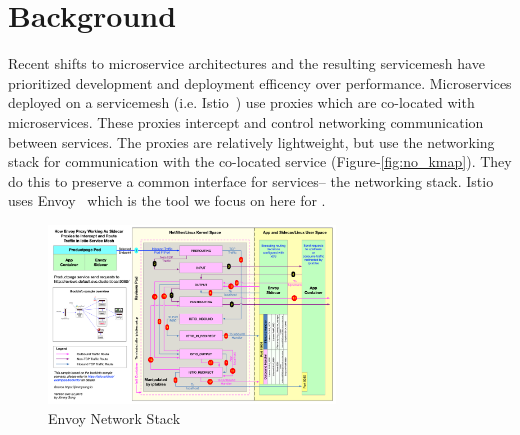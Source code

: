 \section{Background}
\label{sec:background}
Recent shifts to microservice architectures and the resulting servicemesh have prioritized development and deployment efficency over performance.
Microservices deployed on a servicemesh (i.e. Istio~\cite{istio}) use proxies which are co-located with microservices.
These proxies intercept and control networking communication between services.
The proxies are relatively lightweight, but use the networking stack for communication with the co-located service (Figure-\ref{fig:no_kmap}).
They do this to preserve a common interface for services-- the networking stack.
Istio uses Envoy~\cite{envoy} which is the tool we focus on here for \sysname.
\begin{figure}[!htb]
    \begin{minipage}{0.5\textwidth}
        \centering
        \includegraphics[keepaspectratio=true,width=3in]{figures/background/envoy.png}
        \caption{Envoy Network Stack~\cite{envoy_image}}
        \label{fig:envoy}
    \end{minipage}%
\end{figure}


